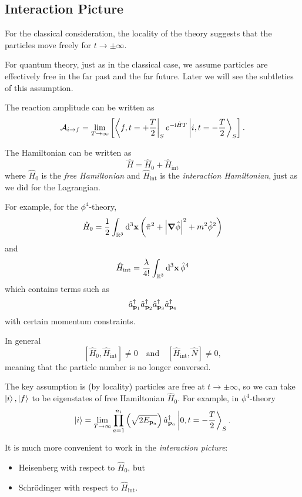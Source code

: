 \documentclass[a4paper,11pt]{article}
\begin{document}
	\subsection{Interaction Picture}

	For the classical consideration, the locality of the theory suggests that the particles move freely for $t \to \pm \infty$.


	For quantum theory, just as in the classical case, we assume particles are effectively free in the far past and the far future. Later we will see the subtleties of this assumption.


	The reaction amplitude can be written as
	\[
		\mathcal{A}_{i \to f} = \lim _{T \to \infty} \left[ \bra{f, t = +\frac{T}{2}}_S{e ^{-\mathrm{i} \hat H T}}\ket{i, t = -\frac{T}{2}}_S \right].
	\]

	The Hamiltonian can be written as 
	\[
		\hat H = \hat H_0 + \hat H _{\text{int}}
	\]
	where $\hat H_0$ is the \emph{free Hamiltonian} and $\hat H _{\text{int}}$ is the \emph{interaction Hamiltonian}, just as we did for the Lagrangian.

	For example, for the $\phi^4$-theory,
	\[
		\hat H_0 = \frac{1}{2} \int _{\mathbb{R}^3} \dd[3]{\vb x} \left( \hat \pi^2 + \abs{\grad \hat \phi}^2 + m^2 \hat \phi^2 \right)
	\]
	and
	\[
		\hat H _{\text{int}} = \frac{\lambda}{4!} \int _{\mathbb{R}^3} \dd[3]{\vb x} \hat \phi^4
	\]
	which contains terms such as 
	\[
		\hat a^{\dagger} _{\vb p_1}\hat a^{\dagger} _{\vb p_2} \hat a^{\dagger} _{\vb p_3} \hat a^{\dagger} _{\vb p_4}
	\]
	with certain momentum constraints.

	In general
	\[
		[\hat H_0 ,\hat H _{\text{int}}] \neq 0 \quad \text{and} \quad [\hat H _{\text{int}}, \hat N] \neq 0,
	\]
	meaning that the particle number is no longer conversed.

	The key assumption is (by locality) particles are free at $t \to \pm \infty$, so we can take $\ket{i}, \ket{f}$ to be eigenstates of free Hamiltonian $\hat H_0$. For example, in $\phi^4$-theory
	\[
		\ket{i} = \lim _{T \to \infty} \prod _{a = 1}^{n_i}\left(\sqrt{2 E _{\vb p_a}} \right)\hat a^{\dagger}_{\vb p_a} \ket{0, t = - \frac{T}{2}}_S.
	\]
	
	It is much more convenient to work in the \emph{interaction picture}:
	\begin{itemize}
		\item Heisenberg with respect to $\hat H_0$, but
		\item Schr\"odinger with respect to $\hat H _{\text{int}}$.
	\end{itemize}
	
\end{document}
